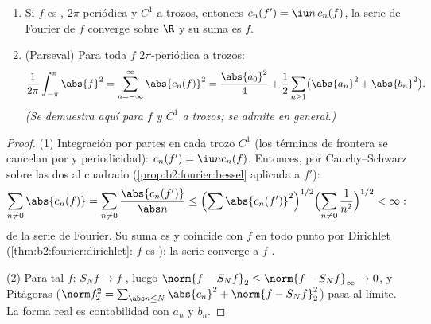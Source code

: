 \begin{theorem}\label{thm:b2:fourier:parseval}
\begin{enumerate}
  \item Si $f$ es , $2\pi$-periódica y $C^1$ a trozos,
        entonces $c_n(f') = \iu n\,c_n(f)$, la serie de Fourier de
        $f$ converge \emph{} sobre $\R$ y su suma es
        $f$.
  \item (Parseval) Para toda $f$ $2\pi$-periódica  a
        trozos:
        \[
        \frac{1}{2\pi}\int_{-\pi}^{\pi}\abs{f}^2
        = \sum_{n=-\infty}^{\infty} \abs{c_n(f)}^2
        = \frac{\abs{a_0}^2}{4} + \frac12\sum_{n\geq1}
        \bigl(\abs{a_n}^2 + \abs{b_n}^2\bigr).
        \]
        \emph{(Se demuestra aquí para $f$  y $C^1$ a
        trozos; se admite en general.)}
\end{enumerate}
\end{theorem}

\begin{proof}
(1) Integración por partes en cada trozo $C^1$ (los términos de
frontera se cancelan por  y periodicidad): $c_n(f') = \iu n
c_n(f)$. Entonces, por Cauchy--Schwarz sobre las dos  al cuadrado (\cref{prop:b2:fourier:bessel} aplicada a
$f'$):
\[
\sum_{n \neq 0} \abs{c_n(f)} = \sum_{n\neq0}
\frac{\abs{c_n(f')}}{\abs n}
\leq \Bigl(\sum \abs{c_n(f')}^2\Bigr)^{1/2}
\Bigl(\sum_{n\neq0}\frac{1}{n^2}\Bigr)^{1/2} < \infty :
\]
 de la serie de Fourier. Su suma es  y
coincide con $f$ en todo punto por Dirichlet
(\cref{thm:b2:fourier:dirichlet}: $f$ es ): la serie converge
a $f$ .

(2) Para tal $f$: $S_N f \to f$ , luego $\norm{f -
S_Nf}_2 \leq \norm{f - S_Nf}_\infty \to 0$, y Pitágoras ($\norm
f_2^2 = \sum_{\abs n \leq N}\abs{c_n}^2 + \norm{f - S_Nf}_2^2$) pasa
al límite. La forma real es contabilidad con $a_n$ y $b_n$.
\end{proof}

